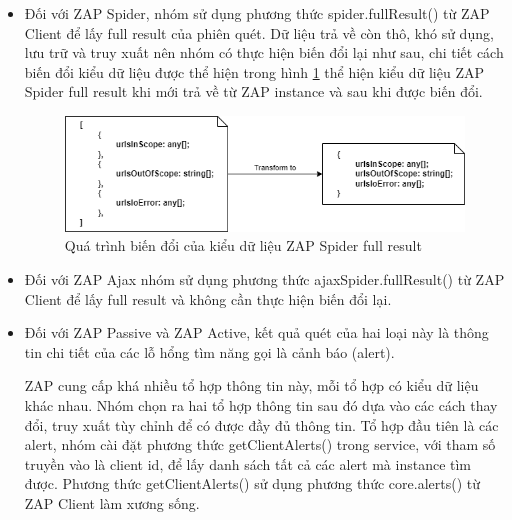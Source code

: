 \begin{itemize}
  \item Đối với ZAP Spider, nhóm sử dụng phương thức spider.fullResult() từ ZAP Client để lấy full result của phiên quét.
        Dữ liệu trả về còn thô, khó sử dụng, lưu trữ và truy xuất nên nhóm có thực hiện biến đổi lại như sau, chi tiết cách biến đổi kiểu dữ liệu được thể hiện trong hình \ref{fig:SpiderTransformData} thể hiện kiểu dữ liệu ZAP Spider full result khi mới trả về từ ZAP instance và sau khi được biến đổi.
        \begin{figure}[H]
          \centering
          \includegraphics[width=\textwidth]{applied-thesis-chapters/chapter-4/Quá trình biến đổi của kiểu dữ liệu ZAP Spider full result.png}
          \caption{Quá trình biến đổi của kiểu dữ liệu ZAP Spider full result}
          \label{fig:SpiderTransformData}
    \end{figure}
  \item Đối với ZAP Ajax nhóm sử dụng phương thức ajaxSpider.fullResult() từ ZAP Client để lấy full result và không cần thực hiện biến đổi lại.
  \item Đối với ZAP Passive và ZAP Active, kết quả quét của hai loại này là thông tin chi tiết của các lỗ hổng tìm năng gọi là cảnh báo (alert).
  
  ZAP cung cấp khá nhiều tổ hợp thông tin này, mỗi tổ hợp có kiểu dữ liệu khác nhau.
  Nhóm chọn ra hai tổ hợp thông tin sau đó dựa vào các cách thay đổi, truy xuất tùy chỉnh để có được đầy đủ thông tin.
  Tổ hợp đầu tiên là các alert, nhóm cài đặt phương thức getClientAlerts() trong service, với tham số truyền vào là client id, để lấy danh sách tất cả các alert mà instance tìm được.
  Phương thức getClientAlerts() sử dụng phương thức core.alerts() từ ZAP Client làm xương sống.
  

\end{itemize}
